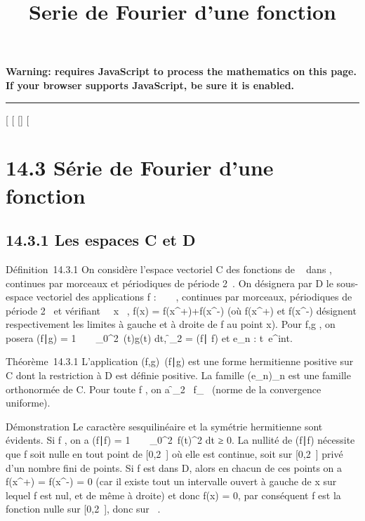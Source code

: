 \documentclass[]{article}
\title{Serie de Fourier d'une fonction}
\author{}
\date{}
\begin{document}
\maketitle

\textbf{Warning: 
requires JavaScript to process the mathematics on this page.\\ If your
browser supports JavaScript, be sure it is enabled.}

\begin{center}\rule{3in}{0.4pt}\end{center}

[
[
[]
[

\section{14.3 Série de Fourier d'une fonction}

\subsection{14.3.1 Les espaces C et D}

Définition~14.3.1 On considère l'espace vectoriel C des fonctions de ~
dans , continues par morceaux et périodiques de période 2\pi~. On
désignera par D le sous-espace vectoriel des applications f : ~ \rightarrow~ ,
continues par morceaux, périodiques de période 2\pi~ et vérifiant
\forall~~x \in {}~, f(x) =
f(x^+)+f(x^-)  (où
f(x^+) et f(x^-) désignent respectivement les
limites à gauche et à droite de f au point x). Pour f,g \inC, on posera
(f∣g) = 1 \pi~
\int ~
_0^2\pi~\overlinef(t)g(t) dt,
\f_2 =
\sqrt(f∣ f) et
e_n : t\mapsto~e^int.

Théorème~14.3.1 L'application
(f,g)\mapsto~(f\mathrel∣g) est
une forme hermitienne positive sur C dont la restriction à D est définie
positive. La famille (e_n)_n\in{} est une famille
orthonormée de C. Pour toute f \inC, on a
\f_2
\leq\ f_\infty~
(norme de la convergence uniforme).

Démonstration Le caractère sesquilinéaire et la symétrie hermitienne
sont évidents. Si f \inC, on a (f∣f) = 1
\pi~ \int ~
_0^2\pi~f(t)^2 dt ≥ 0. La
nullité de (f∣f) nécessite que f soit nulle
en tout point de [0,2\pi~] où elle est continue, soit sur [0,2\pi~]
privé d'un nombre fini de points. Si f est dans D, alors en chacun de
ces points on a f(x^+) = f(x^-) = 0 (car il existe
tout un intervalle ouvert à gauche de x sur lequel f est nul, et de même
à droite) et donc f(x) = 0, par conséquent f est la fonction nulle sur
[0,2\pi~], donc sur ~.
\end{document}
